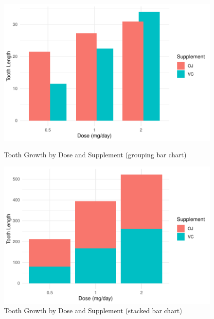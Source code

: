 \documentclass{article}\usepackage[]{graphicx}\usepackage[]{xcolor}
\newenvironment{knitrout}{}{} %
\begin{document}
\begin{figure}[htbp]
  \centering
  \begin{minipage}[b]{0.45\linewidth}
\begin{knitrout}\scriptsize
{}\color{fgcolor}

{\centering \includegraphics[width=\linewidth]{figure/beamer-barchart2-1} 

}


\end{knitrout}
    \caption{Tooth Growth by Dose and Supplement (grouping bar chart)}
    \label{fig:barchart2}
  \end{minipage}
  \hfill
  \begin{minipage}[b]{0.45\linewidth}
\begin{knitrout}\scriptsize
{}\color{fgcolor}

{\centering \includegraphics[width=\linewidth]{figure/beamer-barchart3-1} 

}


\end{knitrout}
    \caption{Tooth Growth by Dose and Supplement (stacked bar chart)}
    \label{fig:barchart3}
  \end{minipage}
\end{figure}
\end{document}

